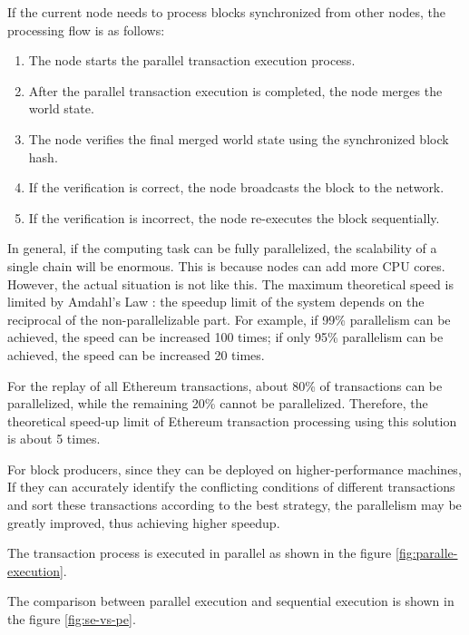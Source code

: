 If the current node needs to process blocks synchronized from other nodes, the processing flow is as follows:

\begin{enumerate}
    \item The node starts the parallel transaction execution process.
    \item After the parallel transaction execution is completed, the node merges the world state.
    \item The node verifies the final merged world state using the synchronized block hash.
    \item If the verification is correct, the node broadcasts the block to the network.
    \item If the verification is incorrect, the node re-executes the block sequentially.
\end{enumerate}

In general, if the computing task can be fully parallelized, the scalability of a single chain will be enormous. This is because nodes can add more CPU cores. However, the actual situation is not like this. The maximum theoretical speed is limited by Amdahl's Law \cite{website:Amdahls-law}: the speedup limit of the system depends on the reciprocal of the non-parallelizable part. For example, if 99\% parallelism can be achieved, the speed can be increased 100 times; if only 95\% parallelism can be achieved, the speed can be increased 20 times.

For the replay of all Ethereum transactions, about 80\% of transactions can be parallelized, while the remaining 20\% cannot be parallelized. Therefore, the theoretical speed-up limit of Ethereum transaction processing using this solution is about 5 times.

For block producers, since they can be deployed on higher-performance machines, If they can accurately identify the conflicting conditions of different transactions and sort these transactions according to the best strategy, the parallelism may be greatly improved, thus achieving higher speedup.

The transaction process is executed in parallel as shown in the figure \ref{fig:paralle-execution}.

The comparison between parallel execution and sequential execution is shown in the figure \ref{fig:se-vs-pe}.

